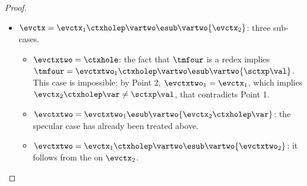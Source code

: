 \begin{proof}
\begin{enumerate}
\begin{itemize}
\begin{itemize}
			\item $\evctxtwo=\evctxtwo_1\ctxholefp\vartwo\esub\vartwo{\evctxtwo_2}$ with $\evctxtwo_2\ctxholep\tmfour=\tmtwo$: note that $\evctx_1\ctxholefp\var=\evctxtwo_1\ctxholefp\vartwo $ so that by Point 2 the two decompositions coincide. This is absurd because then $\var\neq\vartwo$ while by hypothesis $\evctx$ does not capture $\var$.
		\end{itemize}
		\item $\evctx=\evctx_1\ctxholep\vartwo\esub\vartwo{\evctx_2}$: three sub-cases.
		\begin{itemize}
			\item $\evctxtwo=\ctxhole$: the fact that $\tmfour$ is a redex implies $\tmfour=\evctxtwo_1\ctxholep\vartwo\esub\vartwo{\sctxp\val}$. This case is impossible: by Point 2, $\evctxtwo_1=\evctx_1$, which implies $\evctx_2\ctxholep\var\neq\sctxp\val$, that contradicts Point 1.
			\item $\evctxtwo=\evctxtwo_1\esub\vartwo{\evctx_2\ctxholep\var}$: the specular case has already been treated above.
			\item $\evctxtwo=\evctx_1\ctxholep\vartwo\esub\vartwo{\evctxtwo_2}$: it follows from the \ih on $\evctx_2$.\qedhere
		\end{itemize}
	\end{itemize}
\end{enumerate}
\end{proof}


